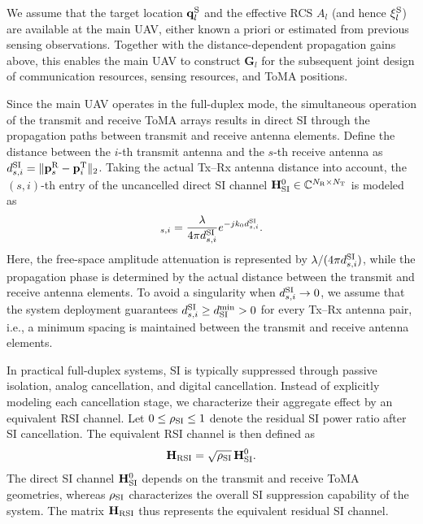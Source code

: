 \documentclass[letterpaper,journal]{IEEEtran}
\begin{document}
We assume that the target location $\mathbf q_l^{\rm S}$ and the
effective RCS $A_l$ (and hence $\xi_l^{\rm S}$) are available at the main UAV,
either known a priori or estimated from previous sensing observations.
Together with the distance-dependent propagation gains above, this
enables the main UAV to construct $\mathbf G_l$ for the subsequent
joint design of communication resources, sensing resources, and ToMA
positions.

Since the main UAV operates in the full-duplex mode, the simultaneous operation of the transmit and receive ToMA arrays results in direct SI through the propagation paths between transmit and receive antenna elements. Define the distance between the $i$-th transmit antenna and the $s$-th receive antenna as $d_{s,i}^{\rm SI}=\|\mathbf p_s^{\rm R}-\mathbf p_i^{\rm T}\|_2$. Taking the actual Tx--Rx antenna distance into account, the $(s,i)$-th entry of the uncancelled direct SI channel $\mathbf H_{\rm SI}^{0}\in\mathbb C^{N_{\rm R}\times N_{\rm T}}$ is modeled as
\begin{equation}
[\mathbf H_{\rm SI}^{0}]_{s,i}
=
\frac{\lambda}{4\pi d_{s,i}^{\rm SI}}
e^{-j k_0d_{s,i}^{\rm SI}}.
\label{eq:direct_si_channel}
\end{equation}
Here, the free-space amplitude attenuation is represented by $\lambda/(4\pi d_{s,i}^{\rm SI})$, while the propagation phase is determined by the actual distance between the transmit and receive antenna elements. To avoid a singularity when $d_{s,i}^{\rm SI}\rightarrow0$, we assume that the system deployment guarantees $d_{s,i}^{\rm SI}\ge d_{\rm SI}^{\min}>0$ for every Tx--Rx antenna pair, i.e., a minimum spacing is maintained between the transmit and receive antenna elements.

In practical full-duplex systems, SI is typically suppressed through passive isolation, analog cancellation, and digital cancellation. Instead of explicitly modeling each cancellation stage, we characterize their aggregate effect by an equivalent RSI channel. Let $0\le\rho_{\rm SI}\le1$ denote the residual SI power ratio after SI cancellation. The equivalent RSI channel is then defined as
\begin{equation}
\mathbf H_{\rm RSI}
=
\sqrt{\rho_{\rm SI}}\,
\mathbf H_{\rm SI}^{0}.
\label{eq:rsi_channel}
\end{equation}
The direct SI channel $\mathbf H_{\rm SI}^{0}$ depends on the transmit and receive ToMA geometries, whereas $\rho_{\rm SI}$ characterizes the overall SI suppression capability of the system. The matrix $\mathbf H_{\rm RSI}$ thus represents the equivalent residual SI channel.
\end{document}
